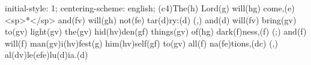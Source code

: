 initial-style: 1;
centering-scheme: english;
(c4)The(h) Lord(g) will(hg) come,(e) <sp>*</sp> and(fv) will(gh) not(fe) tar(d)ry:(d) (,) and(d) will(fv) bring(gv) to(gv) light(gv) the(gv) hid(hv)den(gf) things(gv) of(hg) dark(f)ness,(f) (;) and(f) will(f) man(gv)i(hv)fest(g) him(hv)self(gf) to(gv) all(f) na(fe)tions,(dc) (,) al(dv)le(efe)lu(d)ia.(d)
